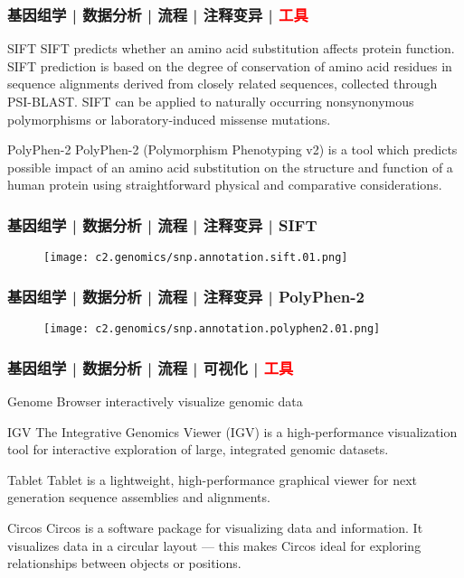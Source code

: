 \begin{frame}
  \frametitle{基因组学 | 数据分析 | 流程 | 注释变异 | \textcolor{red}{工具}}
  \begin{block}{SIFT}
    SIFT predicts whether an amino acid substitution affects protein function. SIFT prediction is based on the degree of conservation of amino acid residues in sequence alignments derived from closely related sequences, collected through PSI-BLAST. SIFT can be applied to naturally occurring nonsynonymous polymorphisms or laboratory-induced missense mutations.
  \end{block}
  \pause
  \begin{block}{PolyPhen-2}
    PolyPhen-2 (Polymorphism Phenotyping v2) is a tool which predicts possible impact of an amino acid substitution on the structure and function of a human protein using straightforward physical and comparative considerations.
  \end{block}
\end{frame}

\begin{frame}
  \frametitle{基因组学 | 数据分析 | 流程 | 注释变异 | SIFT}
  \begin{figure}
    \centering
    \texttt{[image: c2.genomics/snp.annotation.sift.01.png]}
  \end{figure}
\end{frame}

\begin{frame}
  \frametitle{基因组学 | 数据分析 | 流程 | 注释变异 | PolyPhen-2}
  \begin{figure}
    \centering
    \texttt{[image: c2.genomics/snp.annotation.polyphen2.01.png]}
  \end{figure}
\end{frame}

\begin{frame}
  \frametitle{基因组学 | 数据分析 | 流程 | 可视化 | \textcolor{red}{工具}}
  \begin{block}{Genome Browser}
    interactively visualize genomic data
  \end{block}
  \pause
  \begin{block}{IGV}
    The Integrative Genomics Viewer (IGV) is a high-performance visualization tool for interactive exploration of large, integrated genomic datasets.
  \end{block}
  \pause
  \begin{block}{Tablet}
    Tablet is a lightweight, high-performance graphical viewer for next generation sequence assemblies and alignments.
  \end{block}
  \pause
  \begin{block}{Circos}
    Circos is a software package for visualizing data and information. It visualizes data in a circular layout — this makes Circos ideal for exploring relationships between objects or positions.
  \end{block}
\end{frame}

